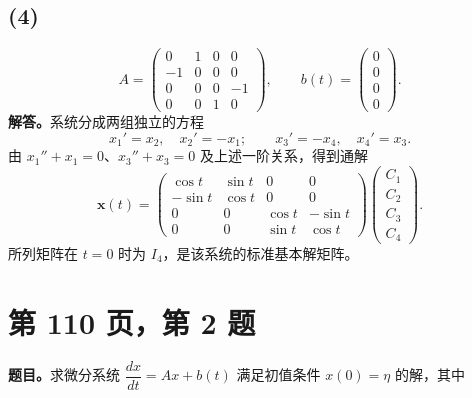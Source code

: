 \documentclass[11pt,a4paper]{ctexart}
\newcommand{\xx}{\boldsymbol{x}}
\begin{document}
\subsection*{(4)}
\[
A=\begin{pmatrix}0&1&0&0\\-1&0&0&0\\0&0&0&-1\\0&0&1&0\end{pmatrix},\qquad
b(t)=\begin{pmatrix}0\\0\\0\\0\end{pmatrix}.
\]
\textbf{解答。}系统分成两组独立的方程
\[
x_1'=x_2,\quad x_2'=-x_1;\qquad
x_3'=-x_4,\quad x_4'=x_3.
\]
由 $x_1''+x_1=0$、$x_3''+x_3=0$ 及上述一阶关系，得到通解
\[
\boxed{\xx(t)=
\begin{pmatrix}
\cos t&\sin t&0&0\\
-\sin t&\cos t&0&0\\
0&0&\cos t&-\sin t\\
0&0&\sin t&\cos t
\end{pmatrix}
\begin{pmatrix}C_1\\C_2\\C_3\\C_4\end{pmatrix}.}
\]
所列矩阵在 $t=0$ 时为 $I_4$，是该系统的标准基本解矩阵。

\newpage
\section*{第 110 页，第 2 题}
\textbf{题目。}求微分系统 $\dfrac{dx}{dt}=Ax+b(t)$ 满足初值条件 $x(0)=\eta$ 的解，其中
\end{document}
